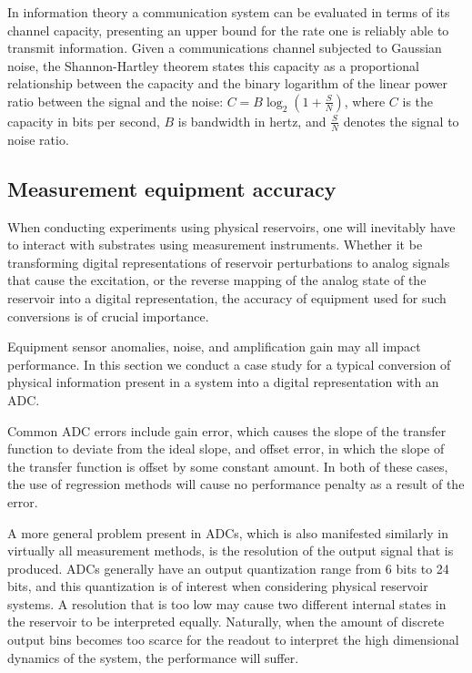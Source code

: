 In information theory a communication system can be evaluated in terms of its
channel capacity, presenting an upper bound for the rate one is reliably able to
transmit information. Given a communications channel subjected to Gaussian
noise, the Shannon-Hartley theorem \cite{shannon_communication_1949} states this
capacity as a proportional relationship between the capacity and the binary
logarithm of the linear power ratio between the signal and the noise: $C =
B\log_2(1 + \frac{S}{N})$, where $C$ is the capacity in bits per second, $B$ is
bandwidth in hertz, and $\frac{S}{N}$ denotes the signal to noise ratio.

\subsection{Measurement equipment accuracy}

When conducting experiments using physical reservoirs, one will inevitably have
to interact with substrates using measurement instruments. Whether it be
transforming digital representations of reservoir perturbations to analog
signals that cause the excitation, or the reverse mapping of the analog state of
the reservoir into a digital representation, the accuracy of equipment used for
such conversions is of crucial importance.

Equipment sensor anomalies, noise, and amplification gain may all impact
performance. In this section we conduct a case study for a typical conversion of
physical information present in a system into a digital representation with an
ADC.

Common ADC errors include gain error, which causes the slope of the transfer
function to deviate from the ideal slope, and offset error, in which the slope
of the transfer function is offset by some constant amount. In both of these
cases, the use of regression methods will cause no performance penalty as a
result of the error.

A more general problem present in ADCs, which is also manifested similarly in
virtually all measurement methods, is the resolution of the output signal that
is produced. ADCs generally have an output quantization range from 6 bits to 24
bits, and this quantization is of interest when considering physical reservoir
systems. A resolution that is too low may cause two different internal states in
the reservoir to be interpreted equally. Naturally, when the amount of discrete
output bins becomes too scarce for the readout to interpret the high dimensional
dynamics of the system, the performance will suffer.

